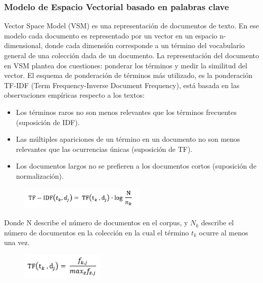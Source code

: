 \documentclass[12pt,letterpaper,openany]{book}
\begin{document}
\subsubsection{Modelo de Espacio Vectorial basado en palabras clave \cite{13}}
Vector Space Model (VSM) es una representación de documentos de texto. En ese modelo cada documento es representado por un vector en un espacio n-dimensional, donde cada dimensión corresponde a un término del vocabulario general de una colección dada de un documento.
\vspace{5mm}\newline
La representación del documento en VSM plantea dos cuestiones: ponderar los términos y medir la similitud del vector. El esquema de ponderación de términos más utilizado, es la ponderación TF-IDF (Term Frequency-Inverse Document Frequency), está basada en las observaciones empíricas respecto a los textos:
\begin{itemize}
    \item Los términos raros no son menos relevantes que los términos frecuentes (suposición de IDF).
    \item Las múltiples apariciones de un término en un documento no son menos relevantes que las ocurrencias únicas (suposición de TF).
    \item Los documentos largos no se prefieren a los documentos cortos (suposición de normalización).
\end{itemize}

\begin{figure}[H]
\begin{center}
\includegraphics[width=6cm]{./imagenes/formulas/form5}
\end{center}
\end{figure}

Donde N describe el número de documentos en el corpus, y $N_{k}$ describe el número de documentos en la colección en la cual el término $t_{k}$ ocurre al menos una vez.

\begin{figure}[H]
\begin{center}
\includegraphics[width=4cm]{./imagenes/formulas/form6}
\end{center}
\end{figure}
\end{document}
